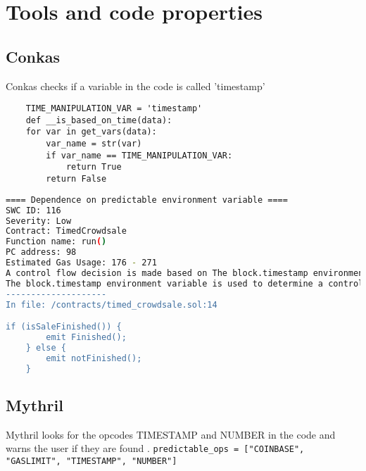 \section{Tools and code properties}

\subsection{Conkas}
Conkas checks if a variable in the code is called 'timestamp' \cite{conkas_opcodes} \newline
\begin{lstlisting}
    TIME_MANIPULATION_VAR = 'timestamp'
    def __is_based_on_time(data):
    for var in get_vars(data):
        var_name = str(var)
        if var_name == TIME_MANIPULATION_VAR:
            return True
        return False
\end{lstlisting}

\begin{lstlisting}[language=bash, caption="conkas output for the timed\_crowdsale.sol contract"]
==== Dependence on predictable environment variable ====
SWC ID: 116
Severity: Low
Contract: TimedCrowdsale
Function name: run()
PC address: 98
Estimated Gas Usage: 176 - 271
A control flow decision is made based on The block.timestamp environment variable.
The block.timestamp environment variable is used to determine a control flow decision. Note that the values of variables like coinbase, gaslimit, block number and timestamp are predictable and can be manipulated by a malicious miner. Also keep in mind that attackers know hashes of earlier blocks. Don't use any of those environment variables as sources of randomness and be aware that use of these variables introduces a certain level of trust into miners.
--------------------
In file: /contracts/timed_crowdsale.sol:14

if (isSaleFinished()) {
        emit Finished();
    } else {
        emit notFinished();
    }
\end{lstlisting}

\subsection{Mythril}
Mythril looks for the opcodes TIMESTAMP and NUMBER in the code and warns the user if they are found \cite{mythril_opcodes}. \newline
\verb|predictable_ops = ["COINBASE", "GASLIMIT", "TIMESTAMP", "NUMBER"]|

